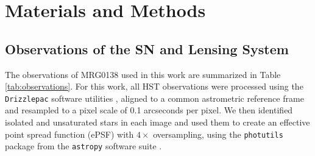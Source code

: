 \documentclass[12pt,dvipsnames]{article}
\begin{document}
\section*{Materials and Methods}

\subsection*{Observations of the SN and Lensing System}

The observations of MRG0138 used in this work are  summarized in Table \ref{tab:observations}.   For this work, all HST observations were processed using the {\tt Drizzlepac} software utilities \cite{gonzaga_drizzlepac_2012}, aligned to a common astrometric reference frame and resampled to a pixel scale of 0.1 arcseconds per pixel.  We then identified isolated and unsaturated stars in each image and used them to create an effective point spread function (ePSF) with $4\times$ oversampling, using the {\tt photutils} package from the {\tt astropy} software suite \cite{astropy_astropy_2013}.   
\end{document}
